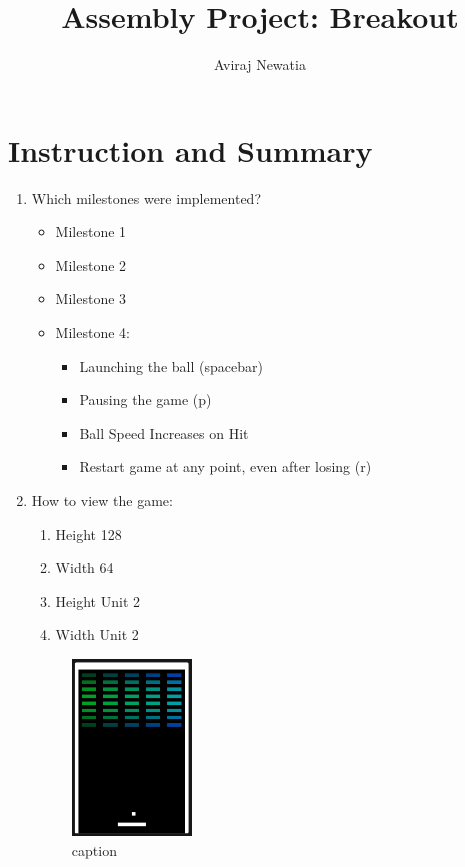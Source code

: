 \documentclass{article}
\title{Assembly Project: Breakout}
\author{Aviraj Newatia}
\begin{document}
\maketitle

\section{Instruction and Summary}

\begin{enumerate}

    \item Which milestones were implemented? 
    \begin{itemize}
    \item   Milestone 1
    \item   Milestone 2
    \item   Milestone 3
    \item   Milestone 4:
    \begin{itemize}
        \item Launching the ball (spacebar)
        \item Pausing the game (p)
        \item Ball Speed Increases on Hit
        \item Restart game at any point, even after losing (r)
    \end{itemize}
    \end{itemize}

    \item How to view the game:
    
    \begin{enumerate}

    \item Height 128
    \item Width 64
    \item Height Unit 2
    \item Width Unit 2


    \end{enumerate}

    

\begin{figure}[ht!]
    \centering
    \includegraphics[width=0.3\textwidth]{scene.png}
    \caption{caption}
    \label{Instructions}
\end{figure}


\end{enumerate}
\end{document}
